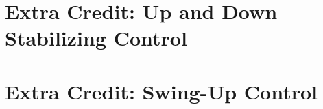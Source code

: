 




\section{Extra Credit: Up and Down Stabilizing Control}

\section{Extra Credit: Swing-Up Control}
